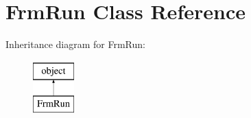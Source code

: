 \hypertarget{class_f_run_1_1_frm_run}{}\section{Frm\+Run Class Reference}
\label{class_f_run_1_1_frm_run}
Inheritance diagram for Frm\+Run\+:\begin{figure}[H]
\begin{center}
\leavevmode
\includegraphics[height=2.000000cm]{class_f_run_1_1_frm_run}
\end{center}
\end{figure}
